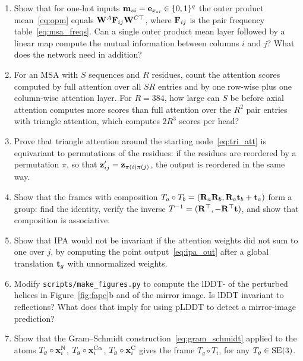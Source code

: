 \begin{enumerate}
  \item Show that for one-hot inputs $\mathbf{m}_{si}=\mathbf{e}_{x_{si}}\in\{0,1\}^q$ the outer product mean~\eqref{eq:opm} equals $\mathbf{W}^A\mathbf{F}_{ij}\mathbf{W}^{C\top}$, where $\mathbf{F}_{ij}$ is the pair frequency table~\eqref{eq:msa_freqs}. Can a single outer product mean layer followed by a linear map compute the mutual information between columns $i$ and $j$? What does the network need in addition?
  \item For an MSA with $S$ sequences and $R$ residues, count the attention scores computed by full attention over all $SR$ entries and by one row-wise plus one column-wise attention layer. For $R=384$, how large can $S$ be before axial attention computes more scores than full attention over the $R^2$ pair entries with triangle attention, which computes $2R^3$ scores per head?
  \item Prove that triangle attention around the starting node~\eqref{eq:tri_att} is equivariant to permutations of the residues: if the residues are reordered by a permutation $\pi$, so that $\mathbf{z}'_{ij}=\mathbf{z}_{\pi(i)\pi(j)}$, the output is reordered in the same way.
  \item Show that the frames with composition $T_a\circ T_b=(\mathbf{R}_a\mathbf{R}_b,\mathbf{R}_a\mathbf{t}_b+\mathbf{t}_a)$ form a group: find the identity, verify the inverse $T^{-1}=(\mathbf{R}^\top,-\mathbf{R}^\top\mathbf{t})$, and show that composition is associative.
  \item Show that IPA would not be invariant if the attention weights did not sum to one over $j$, by computing the point output~\eqref{eq:ipa_out} after a global translation $\mathbf{t}_g$ with unnormalized weights.
  \item Modify \texttt{scripts/make\_figures.py} to compute the lDDT-\Ca{} of the perturbed helices in Figure~\ref{fig:fape}b and of the mirror image. Is lDDT invariant to reflections? What does that imply for using pLDDT to detect a mirror-image prediction?
  \item Show that the Gram--Schmidt construction~\eqref{eq:gram_schmidt} applied to the atoms $T_g\circ\mathbf{x}^{\text{N}}_i$, $T_g\circ\mathbf{x}^{\text{C}\alpha}_i$, $T_g\circ\mathbf{x}^{\text{C}}_i$ gives the frame $T_g\circ T_i$, for any $T_g\in\mathrm{SE}(3)$.
\end{enumerate}

